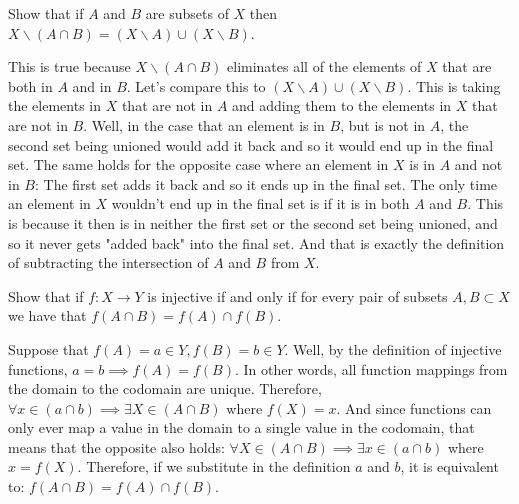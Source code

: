 \documentclass[answers]{exam}
\newcommand{\cA}{\mathcal{A}}
\begin{document}
\begin{questions}
\begin{solution}
\end{solution}

\question[4] Show that if $A$ and $B$ are subsets of $X$ then $X \smallsetminus (A \cap B) = (X \smallsetminus A) \cup (X \smallsetminus B)$.
\begin{solution}
This is true because $X \smallsetminus (A \cap B)$
eliminates all of the elements of $X$ that are both in $A$ and in $B$.
Let's compare this to $(X \smallsetminus A) \cup (X \smallsetminus B)$.
This is taking the elements in $X$ that are not in $A$ and adding them
to the elements in $X$ that are not in $B$.
Well, in the case that an element is in $B$, but is not in $A$,
the second set being unioned would add it back and so
it would end up in the final set.
The same holds for the opposite case where an element in $X$ is in $A$ and not in $B$:
The first set adds it back and so it ends up in the final set.
The only time an element in $X$ wouldn't end up in the final set
is if it is in both $A$ and $B$. This is because it then is in neither
the first set or the second set being unioned, and so it never gets "added back"
into the final set. And that is exactly the definition of subtracting the
intersection of $A$ and $B$ from $X$.
\end{solution}

\question[4] Show that if $f: X \to Y$ is injective if and only if for every pair of subsets $A,B \subset X$ we have that $f(A \cap B) = f(A) \cap f(B)$.

\begin{solution}
Suppose that $f(A) = a \in Y, f(B) = b \in Y$.
Well, by the definition of injective functions,
$a = b \implies f(A) = f(B)$.
In other words, all function mappings from the domain to the codomain are unique.
Therefore, $\forall x \in (a \cap b) \implies \exists X \in (A \cap B)$
where $f(X) = x$.
And since functions can only ever map a value in the domain to a
single value in the codomain, that means that the opposite also holds:
$\forall X \in (A \cap B) \implies \exists x \in (a \cap b)$ where $x = f(X)$.
Therefore, if we substitute in the definition $a$ and $b$, it is equivalent to:
$f(A \cap B)= f(A) \cap f(B)$.
\end{solution}


\end{questions}
\end{document}
